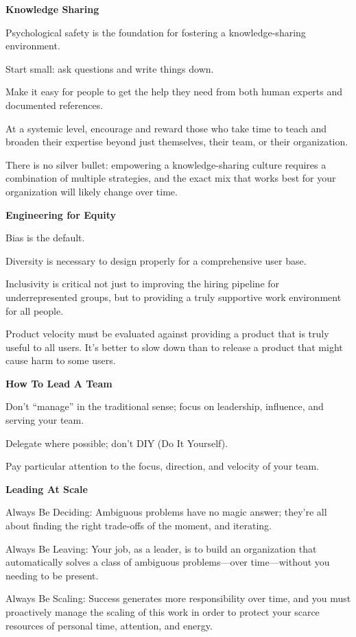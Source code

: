\item \textbf{Knowledge Sharing}
\bit
\item Psychological safety is the foundation for fostering a knowledge-sharing environment.
\item Start small: ask questions and write things down.
\item Make it easy for people to get the help they need from both human experts and documented references.
\item At a systemic level, encourage and reward those who take time to teach and broaden their expertise beyond just
themselves, their team, or their organization.
\item There is no silver bullet: empowering a knowledge-sharing culture requires a combination of multiple
strategies, and the exact mix that works best for your organization will likely change over time.
\eit

\item \textbf{Engineering for Equity}
\bit
\item Bias is the default.
\item Diversity is necessary to design properly for a comprehensive user base.
\item Inclusivity is critical not just to improving the hiring pipeline for underrepresented groups, but to providing
a truly supportive work environment for all people.
\item Product velocity must be evaluated against providing a product that is truly useful to all users. It's better
to slow down than to release a product that might cause harm to some users.
\eit

\item \textbf{How To Lead A Team}
\bit
\item Don't ``manage'' in the traditional sense; focus on leadership, influence, and serving your team.
\item Delegate where possible; don't DIY (Do It Yourself).
\item Pay particular attention to the focus, direction, and velocity of your team.
\eit

\item \textbf{Leading At Scale}
\bit
\item Always Be Deciding: Ambiguous problems have no magic answer; they're all about finding the right trade-offs of
the moment, and iterating.
\item Always Be Leaving: Your job, as a leader, is to build an organization that automatically solves a class of
ambiguous problems—over time—without you needing to be present.
\item Always Be Scaling: Success generates more responsibility over time, and you must proactively manage the scaling
of this work in order to protect your scarce resources of personal time, attention, and energy.
\eit

